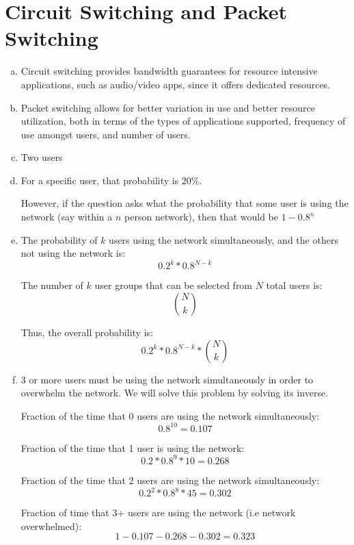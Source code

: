 \documentclass[11pt]{article}
\begin{document}
\section*{Circuit Switching and Packet Switching}
  \begin{enumerate}[(a)]
    \item
      Circuit switching provides bandwidth guarantees for resource intensive
      applications, such as audio/video apps, since it offers dedicated resources.
    \item
      Packet switching allows for better variation in use and better resource utilization, both in terms of the types of applications supported, frequency of use amongst users, and number of users.
    \item
      Two users
    \item
      For a specific user, that probability is $20\%$.

      However, if the question asks what the probability that some user is using
      the network (say within a $n$ person network), then that would be
      $1 - 0.8^n$
    \item
      The probability of $k$ users using the network simultaneously,
      and the others not using the network is:
      \[ 0.2^k * 0.8^{N-k} \]

      The number of $k$ user groups that can be selected from $N$ total users is:
      \[ {N \choose k}\]

      Thus, the overall probability is:
      \[ \boxed{0.2^k * 0.8^{N-k} * {N \choose k}} \]
    \item
      3 or more users must be using the network simultaneously in order to overwhelm
      the network. We will solve this problem by solving its inverse.

      Fraction of the time that 0 users are using the network simultaneously:
      \[ 0.8^{10} = 0.107 \]

      Fraction of the time that 1 user is using the network:
      \[ 0.2 * 0.8^9 * 10 = 0.268 \]

      Fraction of the time that 2 users are using the network simultaneously:
      \[ 0.2^2 * 0.8^8 * 45 = 0.302 \]

      Fraction of time that 3+ users are using the network (i.e network overwhelmed):
      \[ 1 - 0.107 - 0.268 - 0.302 = \boxed{0.323} \]
  \end{enumerate}
\end{document}
